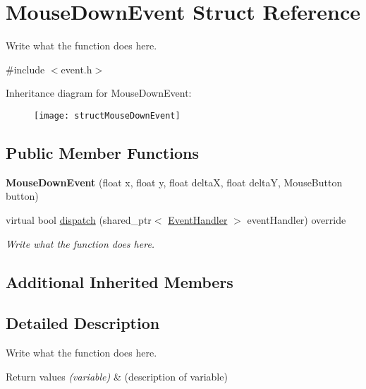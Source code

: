 \hypertarget{structMouseDownEvent}{\section{Mouse\+Down\+Event Struct Reference}
\label{structMouseDownEvent}
}


Write what the function does here.  




{\ttfamily \#include $<$event.\+h$>$}

Inheritance diagram for Mouse\+Down\+Event\+:\begin{figure}[H]
\begin{center}
\leavevmode
\texttt{[image: structMouseDownEvent]}
\end{center}
\end{figure}
\subsection*{Public Member Functions}
\begin{DoxyCompactItemize}
\item 
\hypertarget{structMouseDownEvent_a297d7e50d7363addef438a1a7e0981a8}{{\bfseries Mouse\+Down\+Event} (float x, float y, float delta\+X, float delta\+Y, Mouse\+Button button)}\label{structMouseDownEvent_a297d7e50d7363addef438a1a7e0981a8}

\item 
virtual bool \hyperlink{structMouseDownEvent_a4c3d79107e6cef049a76089fd2b5b431}{dispatch} (shared\+\_\+ptr$<$ \hyperlink{structEventHandler}{Event\+Handler} $>$ event\+Handler) override
\begin{DoxyCompactList}\small\item\em Write what the function does here. \end{DoxyCompactList}\end{DoxyCompactItemize}
\subsection*{Additional Inherited Members}


\subsection{Detailed Description}
Write what the function does here. 


\begin{DoxyRetVals}{Return values}
{\em (variable)} & (description of variable) \\
\hline
\end{DoxyRetVals}


